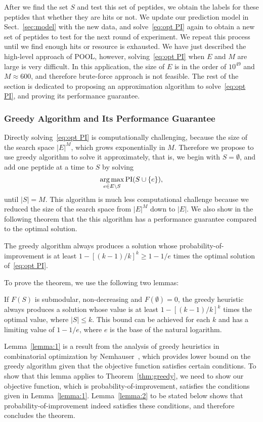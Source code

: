 After we find the set $S$ and test this set of peptides, we obtain the labels for these peptides that whether they are hits or not. We update our prediction model 
in Sect.~\ref{sec:model} with the new data, and solve~\eqref{eq:opt PI} again to obtain a new set of peptides to test for the next round of experiment.
We repeat this process until we find enough hits or resource is exhausted. We have just described the high-level approach of POOL, however, solving~\eqref{eq:opt PI}
when $E$ and $M$ are large is very difficult. In this application, the size of $E$ is in the order of $10^{49}$ and $M \approx 600$, and therefore brute-force approach
is not feasible. The rest of the section is dedicated to proposing an approximation algorithm to solve~\eqref{eq:opt PI}, and proving its performance guarantee. 

\subsubsection{Greedy Algorithm and Its Performance Guarantee} \label{sec:greedy algorithm}
Directly solving~\eqref{eq:opt PI} is computationally challenging, because the size of the search space $|E|^M$, which grows exponentially in $M$. 
Therefore we propose to use greedy algorithm to solve it approximately, that is, we begin with $S = \emptyset$, and add one peptide at a time to $S$ by solving
\begin{equation}
  \underset{e \in E \backslash S}{\mathrm{arg}\max} \,\text{PI} (S \cup \{e\}),
  \label{eq:greedy}
\end{equation}
until $|S| = M$. This algorithm is much less computational challenge because we reduced the size of the search space from $|E|^M$ down to $|E|$. We also show in
the following theorem that the this algorithm has a performance guarantee compared to the optimal solution.

\begin{theorem} \label{thm:greedy}
  The greedy algorithm always produces a solution whose probability-of-improvement is at 
  least $1-[(k-1)/k]^k \geq 1 - 1 / e$ times the optimal solution of~\eqref{eq:opt PI}.
\end{theorem}
To prove the theorem, we use the following two lemmas:
\begin{lemma}  \label{lemma:1}
  If $F(S)$ is submodular, non-decreasing and $F(\emptyset)=0$, the greedy heuristic always 
  produces a solution whose value is at least $1-[(k-1)/k]^k$ times the optimal value, where 
  $|S| \leq k$. This bound can be achieved for each $k$ and has a limiting value of $1-1/e$, 
  where $e$ is the base of the natural logarithm.
\end{lemma}
Lemma~\ref{lemma:1} is a result from the analysis of greedy heuristics in combinatorial optimization by 
Nemhauser~\cite{nemhauser1978analysis}, which provides lower bound on the greedy algorithm given that the objective function 
satisfies certain conditions. To show that this lemma applies to Theorem~\ref{thm:greedy}, we need to show our objective function,
which is probability-of-improvement, satisfies the conditions given in Lemma~\ref{lemma:1}. Lemma~\ref{lemma:2} to be stated below 
shows that probability-of-improvement indeed satisfies these conditions, and therefore concludes the theorem.

